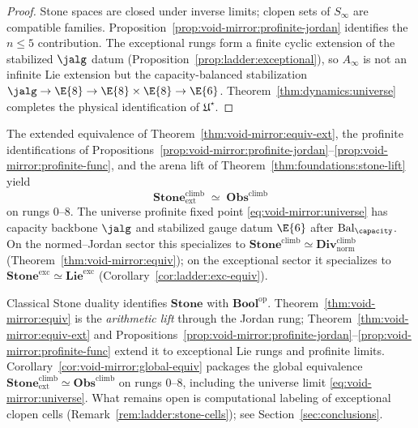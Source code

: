 \begin{proof}
Stone spaces are closed under inverse limits; clopen sets of $S_\infty$ are
compatible families. Proposition~\ref{prop:void-mirror:profinite-jordan}
identifies the $n\leq5$ contribution. The exceptional rungs form a finite
cyclic extension of the stabilized $\jalg$ datum
(Proposition~\ref{prop:ladder:exceptional}), so $A_\infty$ is not an infinite
Lie extension but the capacity-balanced stabilization
$\jalg\to\E{8}\to\E{8}\times\E{8}\to\E{6}$. Theorem~\ref{thm:dynamics:universe}
completes the physical identification of $\mathfrak{U}^\star$.
\end{proof}

\begin{corollary}\label{cor:void-mirror:global-equiv}
The extended equivalence of Theorem~\ref{thm:void-mirror:equiv-ext}, the
profinite identifications of
Propositions~\ref{prop:void-mirror:profinite-jordan}--\ref{prop:void-mirror:profinite-func},
and the arena lift of Theorem~\ref{thm:foundations:stone-lift} yield
\[
  \mathbf{Stone}^{\mathrm{climb}}_{\mathrm{ext}}\;\simeq\;\mathbf{Obs}^{\mathrm{climb}}
\]
on rungs $0$--$8$. The universe profinite fixed point
\eqref{eq:void-mirror:universe} has capacity backbone $\jalg$ and stabilized
gauge datum $\E{6}$ after $\mathrm{Bal}_\capacity$. On the normed--Jordan
sector this specializes to
$\mathbf{Stone}^{\mathrm{climb}}\simeq\mathbf{Div}^{\mathrm{climb}}_{\mathrm{norm}}$
(Theorem~\ref{thm:void-mirror:equiv}); on the exceptional sector it specializes
to $\mathbf{Stone}^{\mathrm{exc}}\simeq\mathbf{Lie}^{\mathrm{exc}}$
(Corollary~\ref{cor:ladder:exc-equiv}).
\end{corollary}

\begin{remark}\label{rem:void-mirror:stone-duality}
Classical Stone duality identifies $\mathbf{Stone}$ with $\mathbf{Bool}^{\mathrm{op}}$.
Theorem~\ref{thm:void-mirror:equiv} is the \emph{arithmetic lift} through the
Jordan rung; Theorem~\ref{thm:void-mirror:equiv-ext} and
Propositions~\ref{prop:void-mirror:profinite-jordan}--\ref{prop:void-mirror:profinite-func}
extend it to exceptional Lie rungs and profinite limits. Corollary~\ref{cor:void-mirror:global-equiv}
packages the global equivalence
$\mathbf{Stone}^{\mathrm{climb}}_{\mathrm{ext}}\simeq\mathbf{Obs}^{\mathrm{climb}}$
on rungs $0$--$8$, including the universe limit \eqref{eq:void-mirror:universe}.
What remains open is computational labeling of exceptional clopen cells
(Remark~\ref{rem:ladder:stone-cells}); see Section~\ref{sec:conclusions}.
\end{remark}

